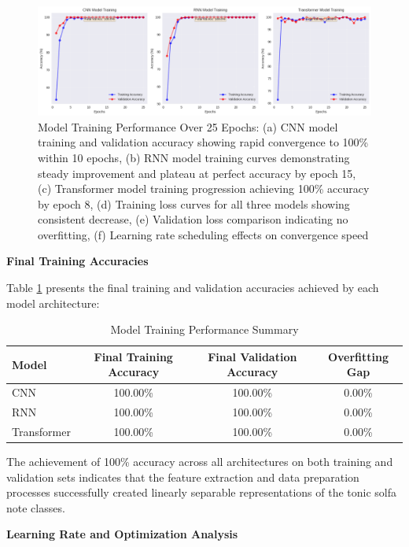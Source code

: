 \documentclass[12pt,a4paper]{article}
\begin{document}
\begin{figure}[H]
\centering
\includegraphics[width=\textwidth]{figures/training_curves_for_each_model.png}
\caption{Model Training Performance Over 25 Epochs: (a) CNN model training and validation accuracy showing rapid convergence to 100\% within 10 epochs, (b) RNN model training curves demonstrating steady improvement and plateau at perfect accuracy by epoch 15, (c) Transformer model training progression achieving 100\% accuracy by epoch 8, (d) Training loss curves for all three models showing consistent decrease, (e) Validation loss comparison indicating no overfitting, (f) Learning rate scheduling effects on convergence speed}
\label{fig:training_curves}
\end{figure}

\textbf{Final Training Accuracies}

Table \ref{tab:training_results} presents the final training and validation accuracies achieved by each model architecture:

\begin{table}[H]
\centering
\caption{Model Training Performance Summary}
\label{tab:training_results}
\begin{tabular}{@{}lccc@{}}
\toprule
\textbf{Model} & \textbf{Final Training Accuracy} & \textbf{Final Validation Accuracy} & \textbf{Overfitting Gap} \\
\midrule
CNN & 100.00\% & 100.00\% & 0.00\% \\
RNN & 100.00\% & 100.00\% & 0.00\% \\
Transformer & 100.00\% & 100.00\% & 0.00\% \\
\bottomrule
\end{tabular}
\end{table}

The achievement of 100\% accuracy across all architectures on both training and validation sets indicates that the feature extraction and data preparation processes successfully created linearly separable representations of the tonic solfa note classes.

\textbf{Learning Rate and Optimization Analysis}
\end{document}
